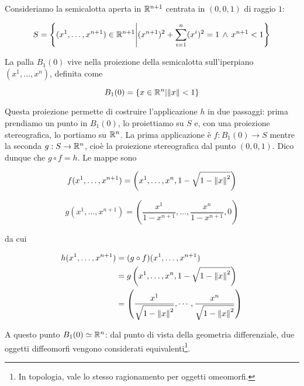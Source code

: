 Consideriamo la semicalotta aperta in $ \mathbb{R}^{n+1} $ centrata in $ (0,0,1) $ di raggio $ 1 $:

\begin{equation}
	S = \left\{ (x^{1}, \dots, x^{n+1}) \in \mathbb{R}^{n+1} \middle| (x^{n+1})^{2} + \sum_{i=1}^{n} (x^{i})^{2} = 1 \, \wedge \, x^{n+1} < 1 \right\}
\end{equation}

La palla $ B_{1}(0) $ vive nella proiezione della semicalotta sull'iperpiano $ (x^{1}, \dots, x^{n}) $, definita come

\begin{equation}
	B_{1}(0) = \left\{ x \in \mathbb{R}^{n} \middle| \norm{x} < 1 \right\}
\end{equation}

Questa proiezione permette di costruire l'applicazione $ h $ in due passaggi: prima prendiamo un punto in $ B_{1}(0) $, lo proiettiamo su $ S $ e, con una proiezione stereografica, lo portiamo su $ \mathbb{R}^{n} $. La prima applicazione è $ f : B_{1}(0) \to S $ mentre la seconda $ g : S \to \mathbb{R}^{n} $, cioè la proiezione stereografica dal punto $ (0,0,1) $. Dico dunque che $ g \circ f = h $. Le mappe sono

\begin{equation}
	f (x^{1},\dots,x^{n+1}) = \left( x^{1},\dots,x^{n},1-\sqrt{1-\norm{x}^{2}} \right)
\end{equation}

\begin{equation}
	g (x^{1},\dots,x^{n+1}) = \left( \dfrac{x^{1}}{1-x^{n+1}},\dots,\dfrac{x^{n}}{1-x^{n+1}},0 \right)
\end{equation}

da cui

\begin{align}
	\begin{split}
		h (x^{1},\dots,x^{n+1}) &= (g \circ f) (x^{1},\dots,x^{n+1})\\
		&= g \left( x^{1},\dots,x^{n},1-\sqrt{1-\norm{x}^{2}} \right)\\
		&= \left( \dfrac{x^{1}}{\sqrt{1 - \norm{x}^{2}}}, \cdots, \dfrac{x^{n}}{\sqrt{1 - \norm{x}^{2}}} \right)
	\end{split}
\end{align}

A questo punto $ B_{1} (0) \simeq \mathbb{R}^{n} $: dal punto di vista della geometria differenziale, due oggetti diffeomorfi vengono considerati equivalenti\footnote{%
	In topologia, vale lo stesso ragionamento per oggetti omeomorfi.}.

